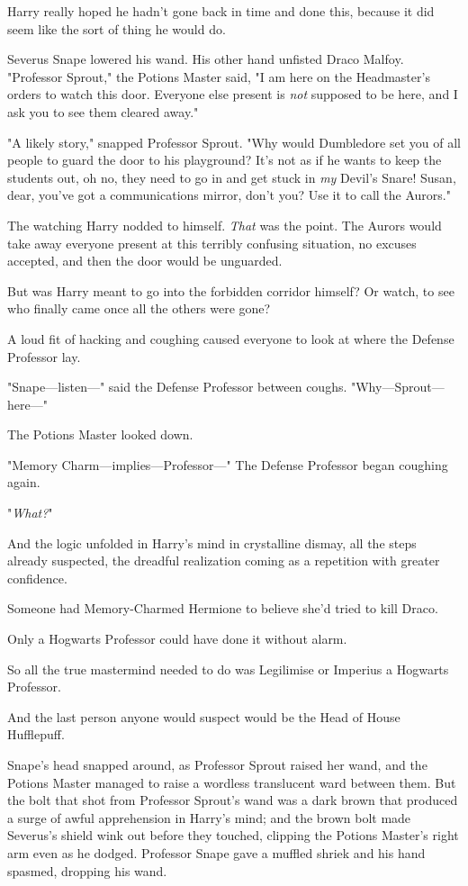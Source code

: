 Harry really hoped he hadn't gone back in time and done this, because it did 
seem like the sort of thing he would do.

Severus Snape lowered his wand. His other hand unfisted Draco Malfoy. 
"Professor Sprout," the Potions Master said, "I am here on the Headmaster's 
orders to watch this door. Everyone else present is \emph{not} supposed to be 
here, and I ask you to see them cleared away."

"A likely story," snapped Professor Sprout. "Why would Dumbledore set you of 
all people to guard the door to his playground? It's not as if he wants to keep 
the students out, oh no, they need to go in and get stuck in \emph{my} Devil's 
Snare! Susan, dear, you've got a communications mirror, don't you? Use it to 
call the Aurors."

The watching Harry nodded to himself. \emph{That} was the point. The Aurors 
would take away everyone present at this terribly confusing situation, no 
excuses accepted, and then the door would be unguarded.

But was Harry meant to go into the forbidden corridor himself? Or watch, to see 
who finally came once all the others were gone?

A loud fit of hacking and coughing caused everyone to look at where the Defense 
Professor lay.

"Snape---listen---" said the Defense Professor between coughs. 
"Why---Sprout---here---"

The Potions Master looked down.

"Memory Charm---implies---Professor---" The Defense Professor began coughing 
again.

"\emph{What?}"

And the logic unfolded in Harry's mind in crystalline dismay, all the steps 
already suspected, the dreadful realization coming as a repetition with greater 
confidence.

Someone had Memory-Charmed Hermione to believe she'd tried to kill Draco.

Only a Hogwarts Professor could have done it without alarm.

So all the true mastermind needed to do was Legilimise or Imperius a Hogwarts 
Professor.

And the last person anyone would suspect would be the Head of House Hufflepuff.

Snape's head snapped around, as Professor Sprout raised her wand, and the 
Potions Master managed to raise a wordless translucent ward between them. But 
the bolt that shot from Professor Sprout's wand was a dark brown that produced 
a surge of awful apprehension in Harry's mind; and the brown bolt made 
Severus's shield wink out before they touched, clipping the Potions Master's 
right arm even as he dodged. Professor Snape gave a muffled shriek and his hand 
spasmed, dropping his wand.

